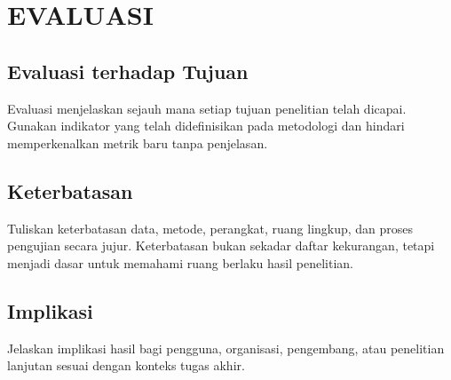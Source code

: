 \chapter{EVALUASI}


\section{Evaluasi terhadap Tujuan}

Evaluasi menjelaskan sejauh mana setiap tujuan penelitian telah dicapai. Gunakan indikator yang telah didefinisikan pada metodologi dan hindari memperkenalkan metrik baru tanpa penjelasan.

\section{Keterbatasan}

Tuliskan keterbatasan data, metode, perangkat, ruang lingkup, dan proses pengujian secara jujur. Keterbatasan bukan sekadar daftar kekurangan, tetapi menjadi dasar untuk memahami ruang berlaku hasil penelitian.

\section{Implikasi}

Jelaskan implikasi hasil bagi pengguna, organisasi, pengembang, atau penelitian lanjutan sesuai dengan konteks tugas akhir.
